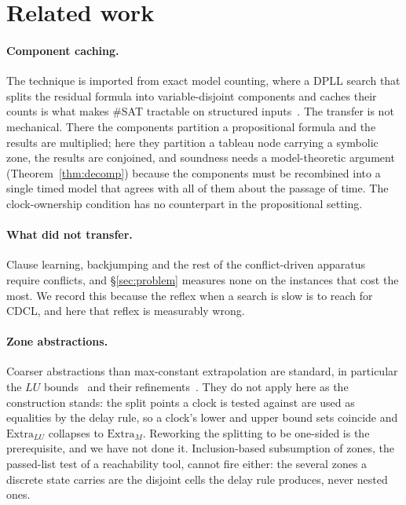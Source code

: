 \section{Related work}
\label{sec:related}

\paragraph{Component caching.} The technique is imported from exact model
counting, where a DPLL search that splits the residual formula into
variable-disjoint components and caches their counts is what makes
\#SAT tractable on structured
inputs~\cite{BacchusDalmaoPitassi2003,SangBeameKautz2005}. The transfer is not
mechanical. There the components partition a propositional formula and the
results are multiplied; here they partition a tableau node carrying a symbolic
zone, the results are conjoined, and soundness needs a model-theoretic argument
(Theorem~\ref{thm:decomp}) because the components must be recombined into a
single timed model that agrees with all of them about the passage of time. The
clock-ownership condition has no counterpart in the propositional setting.

\paragraph{What did not transfer.} Clause learning, backjumping and the rest of
the conflict-driven apparatus~\cite{BiereEtAl2009Handbook} require conflicts,
and \S\ref{sec:problem} measures none on the instances that cost the most. We
record this because the reflex when a search is slow is to reach for CDCL, and
here that reflex is measurably wrong.

\paragraph{Zone abstractions.} Coarser abstractions than max-constant
extrapolation are standard, in particular the $LU$
bounds~\cite{BehrmannBLP2006Lower} and their
refinements~\cite{HerbreteauSW2012Better}. They do not apply here as the
construction stands: the split points a clock is tested against are used as
equalities by the delay rule, so a clock's lower and upper bound sets coincide
and $\mathrm{Extra}_{LU}$ collapses to $\mathrm{Extra}_{M}$. Reworking the
splitting to be one-sided is the prerequisite, and we have not done it.
Inclusion-based subsumption of zones, the passed-list test of a reachability
tool, cannot fire either: the several zones a discrete state carries are the
disjoint cells the delay rule produces, never nested ones.

